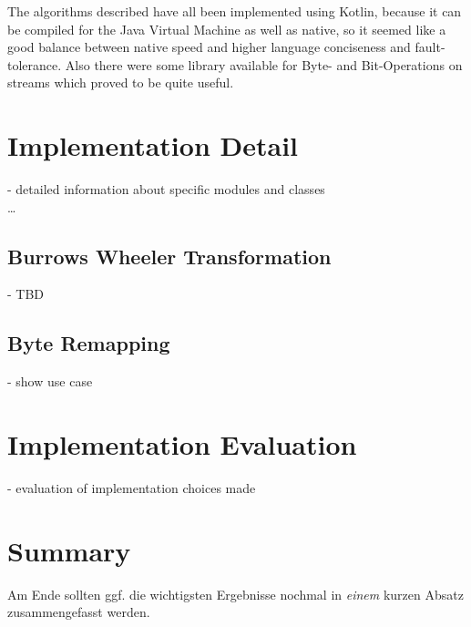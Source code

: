 The algorithms described have all been implemented using Kotlin, because it can be compiled for the Java Virtual Machine as well as native, so it seemed like a good balance between native speed and higher language conciseness and fault-tolerance. Also there were some library available for Byte- and Bit-Operations on streams which proved to be quite useful.

\section{Implementation Detail}
\label{ch:Conceptual Design:sec:Implementation Detail}
- detailed information about specific modules and classes\\
\ldots

\subsection{Burrows Wheeler Transformation}
- TBD\\
\subsection{Byte Remapping}
- show use case \\

\section{Implementation Evaluation}
\label{ch:Conceptual Design:sec:Implementation Evaluation}
- evaluation of implementation choices made


\section{Summary}
\label{ch:Conceptual Design:sec:Summary}

Am Ende sollten ggf. die wichtigsten Ergebnisse nochmal in \emph{einem}
kurzen Absatz zusammengefasst werden.

